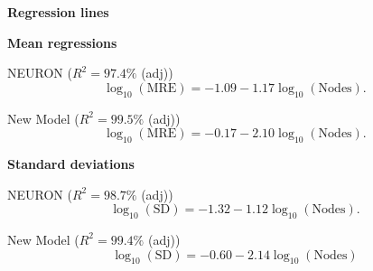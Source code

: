 \documentclass{slides}
\begin{document}
%
%
\begin{slide}
\centerline{\textbf{Regression lines}}

\textbf{Mean regressions}

NEURON ($R^2=97.4\%$ (adj))
\[
\log_{10}(\mbox{MRE})=-1.09-1.17\log_{10}(\mbox{Nodes}).
\]

New Model ($R^2=99.5\%$ (adj))
\[
\log_{10}(\mbox{MRE})=-0.17-2.10\log_{10}(\mbox{Nodes}).
\]

\textbf{Standard deviations}

NEURON ($R^2=98.7\%$ (adj))
\[
\log_{10}(\mbox{SD})=-1.32-1.12\log_{10}(\mbox{Nodes}).
\]

New Model ($R^2=99.4\%$ (adj))
\[
\log_{10}(\mbox{SD})=-0.60-2.14\log_{10}(\mbox{Nodes})
\]
\end{slide}
\closegraphsfile
\end{document}
